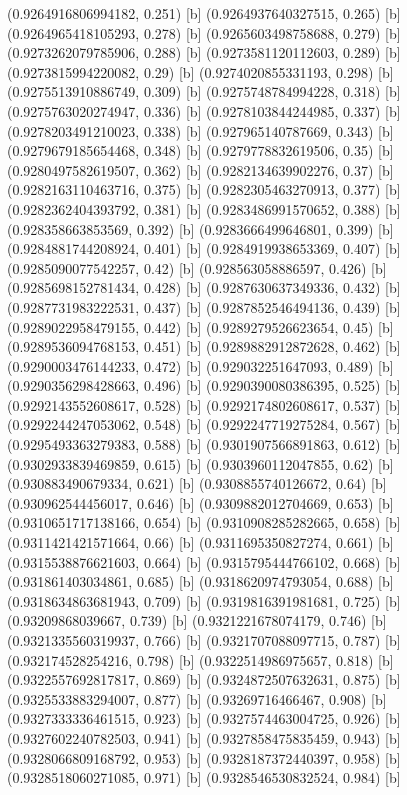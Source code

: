 {{{(0.9264916806994182, 0.251) [b] 
(0.9264937640327515, 0.265) [b] 
(0.9264965418105293, 0.278) [b] 
(0.9265603498758688, 0.279) [b] 
(0.9273262079785906, 0.288) [b] 
(0.9273581120112603, 0.289) [b] 
(0.9273815994220082, 0.29) [b] 
(0.9274020855331193, 0.298) [b] 
(0.9275513910886749, 0.309) [b] 
(0.9275748784994228, 0.318) [b] 
(0.9275763020274947, 0.336) [b] 
(0.9278103844244985, 0.337) [b] 
(0.9278203491210023, 0.338) [b] 
(0.927965140787669, 0.343) [b] 
(0.9279679185654468, 0.348) [b] 
(0.9279778832619506, 0.35) [b] 
(0.9280497582619507, 0.362) [b] 
(0.9282134639902276, 0.37) [b] 
(0.9282163110463716, 0.375) [b] 
(0.9282305463270913, 0.377) [b] 
(0.9282362404393792, 0.381) [b] 
(0.9283486991570652, 0.388) [b] 
(0.928358663853569, 0.392) [b] 
(0.9283666499646801, 0.399) [b] 
(0.9284881744208924, 0.401) [b] 
(0.9284919938653369, 0.407) [b] 
(0.9285090077542257, 0.42) [b] 
(0.928563058886597, 0.426) [b] 
(0.9285698152781434, 0.428) [b] 
(0.9287630637349336, 0.432) [b] 
(0.9287731983222531, 0.437) [b] 
(0.9287852546494136, 0.439) [b] 
(0.9289022958479155, 0.442) [b] 
(0.9289279526623654, 0.45) [b] 
(0.9289536094768153, 0.451) [b] 
(0.9289882912872628, 0.462) [b] 
(0.9290003476144233, 0.472) [b] 
(0.929032251647093, 0.489) [b] 
(0.9290356298428663, 0.496) [b] 
(0.9290390080386395, 0.525) [b] 
(0.9292143552608617, 0.528) [b] 
(0.9292174802608617, 0.537) [b] 
(0.9292244247053062, 0.548) [b] 
(0.9292247719275284, 0.567) [b] 
(0.9295493363279383, 0.588) [b] 
(0.9301907566891863, 0.612) [b] 
(0.9302933839469859, 0.615) [b] 
(0.9303960112047855, 0.62) [b] 
(0.930883490679334, 0.621) [b] 
(0.9308855740126672, 0.64) [b] 
(0.930962544456017, 0.646) [b] 
(0.9309882012704669, 0.653) [b] 
(0.9310651717138166, 0.654) [b] 
(0.9310908285282665, 0.658) [b] 
(0.9311421421571664, 0.66) [b] 
(0.9311695350827274, 0.661) [b] 
(0.9315538876621603, 0.664) [b] 
(0.9315795444766102, 0.668) [b] 
(0.931861403034861, 0.685) [b] 
(0.9318620974793054, 0.688) [b] 
(0.9318634863681943, 0.709) [b] 
(0.9319816391981681, 0.725) [b] 
(0.93209868039667, 0.739) [b] 
(0.9321221678074179, 0.746) [b] 
(0.9321335560319937, 0.766) [b] 
(0.9321707088097715, 0.787) [b] 
(0.932174528254216, 0.798) [b] 
(0.9322514986975657, 0.818) [b] 
(0.9322557692817817, 0.869) [b] 
(0.9324872507632631, 0.875) [b] 
(0.9325533883294007, 0.877) [b] 
(0.93269716466467, 0.908) [b] 
(0.9327333336461515, 0.923) [b] 
(0.9327574463004725, 0.926) [b] 
(0.9327602240782503, 0.941) [b] 
(0.9327858475835459, 0.943) [b] 
(0.9328066809168792, 0.953) [b] 
(0.9328187372440397, 0.958) [b] 
(0.9328518060271085, 0.971) [b] 
(0.9328546530832524, 0.984) [b] 
}}}
